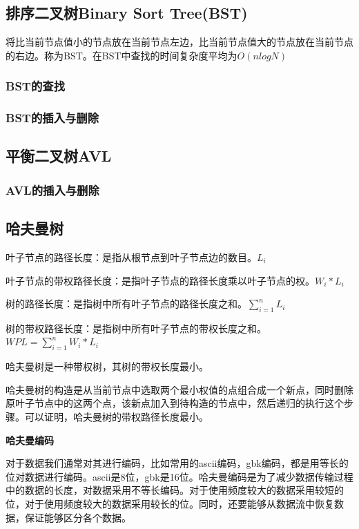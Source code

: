 \documentclass{article}
\begin{document}
	\subsection{排序二叉树Binary Sort Tree(BST)}
		将比当前节点值小的节点放在当前节点左边，比当前节点值大的节点放在当前节点的右边。称为BST。在BST中查找的时间复杂度平均为$O(nlogN)$
		\subsubsection{BST的查找}
		\subsubsection{BST的插入与删除}
	\subsection{平衡二叉树AVL}
		\subsubsection{AVL的插入与删除}
	\subsection{哈夫曼树}
		叶子节点的路径长度：是指从根节点到叶子节点边的数目。$L_i$

		叶子节点的带权路径长度：是指叶子节点的路径长度乘以叶子节点的权。$W_i*L_i$

		树的路径长度：是指树中所有叶子节点的路径长度之和。$\sum^{n}_{i=1}{L_i}$

		树的带权路径长度：是指树中所有叶子节点的带权长度之和。$WPL=\sum_{i=1}^{n}{W_i*L_i}$

		哈夫曼树是一种带权树，其树的带权长度最小。

		哈夫曼树的构造是从当前节点中选取两个最小权值的点组合成一个新点，同时删除原叶子节点中的这两个点，该新点加入到待构造的节点中，然后递归的执行这个步骤。可以证明，哈夫曼树的带权路径长度最小。

		\textbf{哈夫曼编码}

		对于数据我们通常对其进行编码，比如常用的ascii编码，gbk编码，都是用等长的位对数据进行编码。ascii是8位，gbk是16位。哈夫曼编码是为了减少数据传输过程中的数据的长度，对数据采用不等长编码。对于使用频度较大的数据采用较短的位，对于使用频度较大的数据采用较长的位。同时，还要能够从数据流中恢复数据，保证能够区分各个数据。
\end{document}
